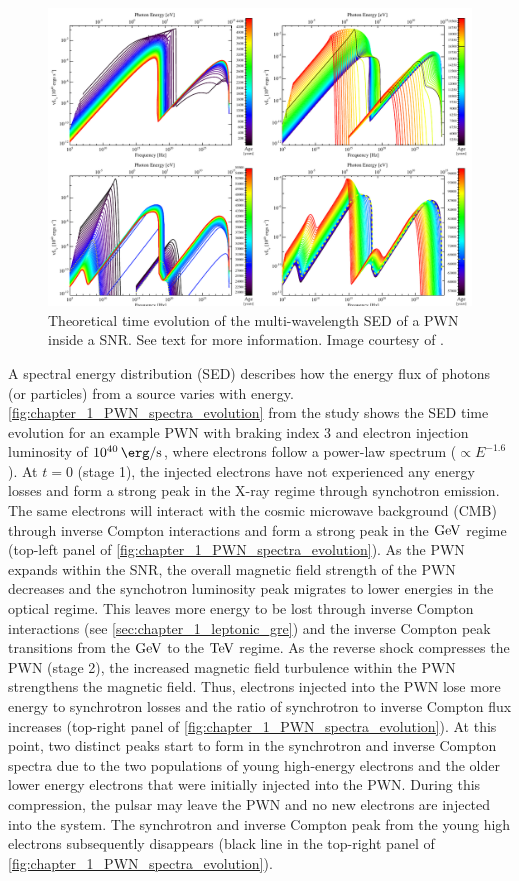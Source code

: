 \begin{figure}[h!]
    \centering
    \includegraphics[width=\textwidth]{04_Introduction/Images/pulsar_wind_nebula/pwn_spectra_evolution.pdf}
    \caption{Theoretical time evolution of the multi-wavelength SED of a PWN inside a SNR. See text for more information. Image courtesy of \cite{2009ApJ...703.2051G}.}
    \label{fig:chapter_1_PWN_spectra_evolution}
\end{figure}
A spectral energy distribution (SED) describes how the energy flux of photons (or particles) from a source varies with energy. \autoref{fig:chapter_1_PWN_spectra_evolution} from the study \cite{2009ApJ...703.2051G} shows the SED time evolution for an example PWN with braking index $3$ and electron injection luminosity of $10^{40}\,\ergspersec$, where electrons follow a power-law spectrum ($\propto E^{-1.6}$).
\newpar
At $t=0$ (stage 1), the injected electrons have not experienced any energy losses and form a strong peak in the X-ray regime through synchotron emission. The same electrons will interact with the cosmic microwave background (CMB) through inverse Compton interactions and form a strong peak in the $\si{\giga\electronvolt}$ regime  (top-left panel of \autoref{fig:chapter_1_PWN_spectra_evolution}). As the PWN expands within the SNR, the overall magnetic field strength of the PWN decreases and the synchotron luminosity peak migrates to lower energies in the optical regime. This leaves more energy to be lost through inverse Compton interactions (see \autoref{sec:chapter_1_leptonic_gre}) and the inverse Compton peak transitions from the $\si{\giga\electronvolt}$ to the $\TeV$ regime.
\newpar
As the reverse shock compresses the PWN (stage 2), the increased magnetic field turbulence within the PWN strengthens the magnetic field. Thus, electrons injected into the PWN lose more energy to synchrotron losses and the ratio of synchrotron to inverse Compton flux increases (top-right panel of \autoref{fig:chapter_1_PWN_spectra_evolution}). At this point, two distinct peaks start to form in the synchrotron and inverse Compton spectra due to the two populations of young high-energy electrons and the older lower energy electrons that were initially injected into the PWN. During this compression, the pulsar may leave the PWN and no new electrons are injected into the system. The synchrotron and inverse Compton peak from the young high electrons subsequently disappears (black line in the top-right panel of \autoref{fig:chapter_1_PWN_spectra_evolution}).
